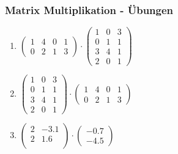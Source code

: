 \begin{frame}
\frametitle{Matrix Multiplikation - Übungen}
\begin{enumerate}
\item $ \begin{pmatrix} 
1 & 4 & 0 & 1\\ 
0 & 2 & 1 & 3 
\end{pmatrix} 
\cdot 
\begin{pmatrix} 
1 & 0 & 3 \\ 
0 & 1 & 1\\
3 & 4 & 1\\
2 & 0 & 1
\end{pmatrix} $
\item 
$\begin{pmatrix} 
1 & 0 & 3 \\ 
0 & 1 & 1\\
3 & 4 & 1\\
2 & 0 & 1
\end{pmatrix} 
\cdot 
\begin{pmatrix} 
1 & 4 & 0 & 1\\ 
0 & 2 & 1 & 3 
\end{pmatrix} $
\item
$\begin{pmatrix}
2 & -3.1 \\
2 & 1.6 \\
\end{pmatrix}
\cdot
\begin{pmatrix}
-0.7 \\
-4.5 
\end{pmatrix}$
\end{enumerate}
\end{frame}

